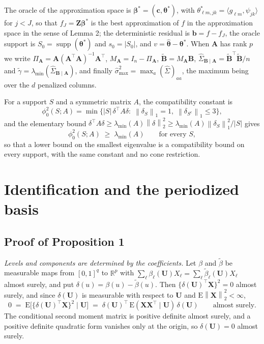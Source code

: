 \documentclass[10pt]{book}
\theoremstyle{definition}
\newcommand{\R}{\mathbb{R}}
\newcommand{\E}{\mathrm{E}}
\newcommand{\T}{^{\top}}
\newcommand{\norm}[1]{\left\lVert #1 \right\rVert}
\newcommand{\inner}[2]{\langle #1, #2 \rangle}
\newcommand{\cv}{\ell}
\newcommand{\md}{m}
\newcommand{\lev}{j}
\newcommand{\tsl}{k}
\newcommand{\bX}{\mathbf{X}}
\newcommand{\bU}{\mathbf{U}}
\newcommand{\bZ}{\mathbf{Z}}
\newcommand{\fcoef}[1]{\beta_{#1}}
\newcommand{\gcomp}[2]{g_{#1#2}}
\newcommand{\wav}[2]{\psi_{#1#2}}
\newcommand{\coefs}[4]{\theta^{*}_{#1#2,#3#4}}
\newcommand{\btheta}{\boldsymbol{\theta}}
\newcommand{\thetastar}{\btheta^{*}}
\newcommand{\thetahat}{\widehat{\btheta}}
\newcommand{\bbeta}{\boldsymbol{\beta}}
\newcommand{\betastar}{\bbeta^{*}}
\newcommand{\bc}{\mathbf{c}}
\newcommand{\Gramhat}{\widehat{\Sigma}}
\newcommand{\Szero}{S_{0}}
\newcommand{\Amat}{\mathbf{A}}
\newcommand{\Bmat}{\mathbf{B}}
\newcommand{\Btil}{\widetilde{\Bmat}}
\newcommand{\PA}{\Pi_{\Amat}}
\newcommand{\MA}{M_{\Amat}}
\newcommand{\bb}{\mathbf{b}}
\newcommand{\smax}{\widehat{\sigma}_{\max}}
\newcommand{\gtil}{\widetilde{\gamma}}
\newcommand{\lmin}{\lambda_{\min}}
\newcommand{\compat}{\phi_{0}}
\newcommand{\GBA}{\Gramhat_{\Bmat\mid\Amat}}
\DeclareMathOperator{\supp}{supp}
\begin{document}
The \textcolor{colR1}{oracle of the approximation space} is $\betastar = (\bc,\thetastar)$, with
$\coefs{\cv}{\md}{\lev}{\tsl} = \inner{\gcomp{\cv}{\md}}{\wav{\lev}{\tsl}}$
for $\lev < J$, so that $f_J = \bZ\betastar$ is the best approximation of $f$
in the \textcolor{colR1}{approximation space} in the sense of Lemma 2; the deterministic residual is
$\bb = f - f_J$, the oracle support is $\Szero = \supp(\thetastar)$ and
$s_0 = |\Szero|$, and $v = \thetahat - \thetastar$. When $\Amat$ has rank $p$
we write $\PA = \Amat(\Amat\T\Amat)^{-1}\Amat\T$, $\MA = I_n - \PA$,
$\Btil = \MA\Bmat$, $\GBA = \Btil\T\Btil/n$ and $\gtil = \lmin(\GBA)$, and
finally $\smax^2 = \max_a(\Gramhat)_{aa}$, the maximum being over the $d$
penalized columns.

For a support $S$ and a symmetric matrix $A$, the compatibility constant is
\[
  \compat^2(S;A) = \min\bigl\{|S|\,\delta\T A \delta :\;
  \norm{\delta_S}_1 = 1,\; \norm{\delta_{S^c}}_1 \le 3 \bigr\},
\]
and the elementary bound
$\delta\T A\delta \ge \lmin(A)\norm{\delta}_2^2 \ge
\lmin(A)\norm{\delta_S}_1^2/|S|$ gives
\begin{equation}
  \label{eq:compat-lmin}
  \compat^2(S;A) \;\ge\; \lmin(A) \qquad \text{for every } S,
\end{equation}
so that a lower bound on the smallest eigenvalue is a compatibility bound on
every support, with the same constant and no cone restriction.

\section{Identification and the periodized basis}
\setcounter{equation}{0}

\subsection*{Proof of Proposition 1}

\emph{Levels and components are determined by the coefficients.} Let $\beta$
and $\tilde\beta$ be measurable maps from $[0,1]^q$ to $\R^p$ with
$\sum_{\cv}\fcoef{\cv}(\bU)X_{\cv} = \sum_{\cv}\tilde\beta_{\cv}(\bU)X_{\cv}$
almost surely, and put $\delta(u) = \beta(u)-\tilde\beta(u)$. Then
$\{\delta(\bU)\T\bX\}^2 = 0$ almost surely, and since $\delta(\bU)$ is
measurable with respect to $\bU$ and $\E\norm{\bX}_2^2 < \infty$,
\[
  0 \;=\; \E\bigl[\{\delta(\bU)\T\bX\}^2 \mid \bU\bigr]
  \;=\; \delta(\bU)\T\,\E(\bX\bX\T\mid\bU)\,\delta(\bU)
  \qquad \text{almost surely.}
\]
The conditional second moment matrix is positive definite almost surely, and a
positive definite quadratic form vanishes only at the origin, so
$\delta(\bU) = 0$ almost surely.
\end{document}
